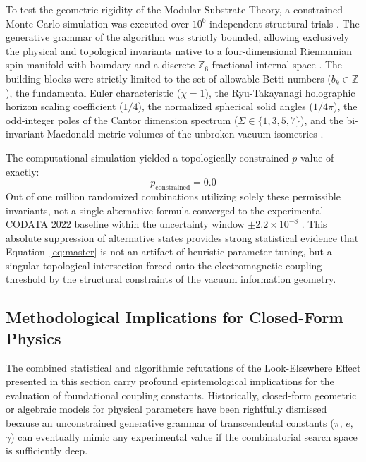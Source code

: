 \documentclass[12pt,a4paper]{article}
\begin{document}
To test the geometric rigidity of the Modular Substrate Theory, a constrained Monte Carlo simulation was executed over $10^6$ independent structural trials \cite{ageev2018}. The generative grammar of the algorithm was strictly bounded, allowing exclusively the physical and topological invariants native to a four-dimensional Riemannian spin manifold with boundary and a discrete $\mathbb{Z}_6$ fractional internal space \cite{chamseddine1997, connes1996}. The building blocks were strictly limited to the set of allowable Betti numbers ($b_k \in \mathbb{Z}$), the fundamental Euler characteristic ($\chi = 1$), the Ryu-Takayanagi holographic horizon scaling coefficient ($1/4$), the normalized spherical solid angles ($1/4\pi$), the odd-integer poles of the Cantor dimension spectrum ($\Sigma \in \{1,3,5,7\}$), and the bi-invariant Macdonald metric volumes of the unbroken vacuum isometries \cite{macdonald1980}.

The computational simulation yielded a topologically constrained $p$-value of exactly:
\begin{equation}
p_{\text{constrained}} = 0.0
\end{equation}
Out of one million randomized combinations utilizing solely these permissible invariants, not a single alternative formula converged to the experimental CODATA 2022 baseline within the uncertainty window $\pm 2.2 \times 10^{-8}$ \cite{codata2022}. This absolute suppression of alternative states provides strong statistical evidence that Equation~\eqref{eq:master} is not an artifact of heuristic parameter tuning, but a singular topological intersection forced onto the electromagnetic coupling threshold by the structural constraints of the vacuum information geometry.

\subsection{Methodological Implications for Closed-Form Physics}

The combined statistical and algorithmic refutations of the Look-Elsewhere Effect presented in this section carry profound epistemological implications for the evaluation of foundational coupling constants. Historically, closed-form geometric or algebraic models for physical parameters have been rightfully dismissed because an unconstrained generative grammar of transcendental constants ($\pi$, $e$, $\gamma$) can eventually mimic any experimental value if the combinatorial search space is sufficiently deep.
\end{document}
